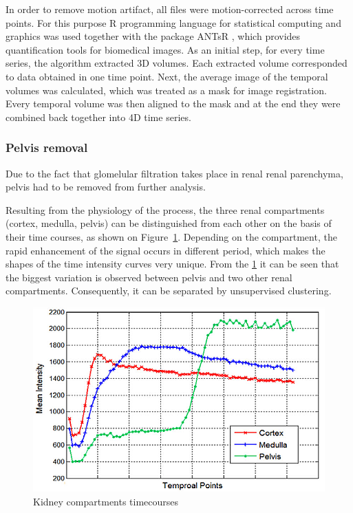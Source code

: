 In order to remove motion artifact, all files were motion-corrected across time points. For this purpose R programming language for statistical computing and graphics was used \cite{R} together with the package ANTsR \cite{ANTsR}, which provides quantification tools for biomedical images. As an initial step, for every time series, the algorithm extracted 3D volumes. Each extracted volume corresponded to data obtained in one time point. Next, the average image of the temporal volumes was calculated, which was treated as a mask for image registration. Every temporal volume was then aligned to the mask and at the end they were combined back together into 4D time series.

\subsubsection{Pelvis removal}
Due to the fact that glomelular filtration takes place in renal renal parenchyma, pelvis had to be removed from further analysis. 

Resulting from the physiology of the process, the three renal compartments (cortex, medulla, pelvis) can be distinguished from each other on the basis of their time courses, as shown on Figure~\ref{fig:timecourses}. Depending on the compartment, the rapid enhancement of the signal occurs in different period, which makes the shapes of the time intensity curves very unique.
From the \ref{fig:timecourses} it can be seen that the biggest variation is observed between pelvis and two other renal compartments.    Consequently, it can be separated by unsupervised clustering. 

\begin{figure}[H]
	\centering
	\includegraphics{img/timecourses}
	\caption{Kidney compartments timecourses  \cite{KidneySubsegmentation}}
	\label{fig:timecourses}
\end{figure}

